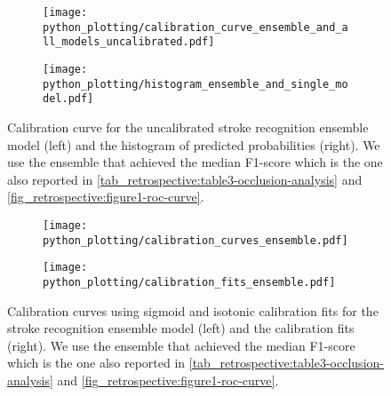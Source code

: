 \begin{figure}
    \begin{subfigure}[c]{0.48\columnwidth}
        \centering
        \texttt{[image: python\_plotting/calibration\_curve\_ensemble\_and\_all\_models\_uncalibrated.pdf]}
    \end{subfigure}
    \begin{subfigure}[c]{0.48\columnwidth}
        \centering
        \texttt{[image: python\_plotting/histogram\_ensemble\_and\_single\_model.pdf]}
    \end{subfigure}
    \caption[Calibration curve for the uncalibrated stroke recognition model and empirical distribution of predicted probabilities.]{%
        Calibration curve for the uncalibrated stroke recognition ensemble model (left) and the histogram of predicted probabilities (right). 
        We use the ensemble that achieved the median F1-score which is the one also reported in \cref{tab_retrospective:table3-occlusion-analysis} and \cref{fig_retrospective:figure1-roc-curve}.}
    \label{fig_discussion:retrospective-paper-calibration-curve-of-uncalibrated-model}
\end{figure}

\begin{figure}
    \begin{subfigure}[c]{0.48\columnwidth}
        \centering
        \texttt{[image: python\_plotting/calibration\_curves\_ensemble.pdf]}
    \end{subfigure}
    \begin{subfigure}[c]{0.48\columnwidth}
        \centering
        \texttt{[image: python\_plotting/calibration\_fits\_ensemble.pdf]}
    \end{subfigure}
    \caption[Calibration fits and curves for the stroke recognition model using Platt-scaling and isotonic regression for calibration.]{ Calibration curves using sigmoid and isotonic calibration fits for the stroke recognition ensemble model (left) and the calibration fits (right). We use the ensemble that achieved the median F1-score which is the one also reported in \cref{tab_retrospective:table3-occlusion-analysis} and \cref{fig_retrospective:figure1-roc-curve}.}
    \label{fig_discussion:retrospective-paper-calibration-curve-sigmoid-isotonic}
\end{figure}



